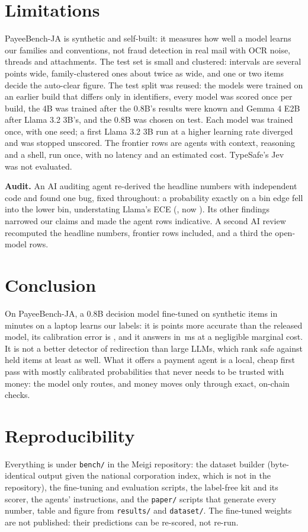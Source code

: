 \documentclass[conference]{IEEEtran}
\begin{document}
\section{Limitations}
PayeeBench-JA is synthetic and self-built: it measures how well a model learns our families and conventions, not fraud
detection in real mail with OCR noise, threads and attachments. The test set is small and clustered: intervals are
several points wide, family-clustered ones about twice as wide, and one or two items decide the \NBudget{} auto-clear
figure. The test split was reused: the models were trained on an earlier build that differs only in identifiers,
every model was scored once per build, the 4B was trained after the 0.8B's results were known and Gemma 4 E2B after
Llama 3.2 3B's, and the 0.8B was chosen on test. Each model was trained once, with one seed; a first Llama 3.2 3B run at a
higher learning rate diverged and was stopped unscored. The frontier rows are agents with context, reasoning and a shell,
run once, with no latency and an estimated cost. TypeSafe's Jev~\cite{typesafe_models} was not evaluated.

\textbf{Audit.} An AI auditing agent re-derived the headline numbers with independent code and found one bug, fixed
throughout: a probability exactly on a bin edge fell into the lower bin, understating Llama's ECE
(\NLlamaEceBeforeFix{}, now \NLlamaEce{}). Its other findings narrowed our claims and made the agent rows indicative. A
second AI review recomputed the headline numbers, frontier rows included, and a third the open-model rows.

\section{Conclusion}
On PayeeBench-JA, a 0.8B decision model fine-tuned on \NNTrain{} synthetic items in \NTrainMin{} minutes on a laptop
learns our labels: it is \NVsBaseDelta{} points more accurate than the released model, its calibration error is
\NOursEceStanding{}, and it answers in \NOursPfifty{}\,ms at a negligible marginal cost. It is not a better detector of
redirection than large LLMs, which rank safe against held items at least as well\NOpenConclusion{}.\NFrontierConclusion{} What it offers
a payment agent is a local, cheap first pass with mostly calibrated probabilities that never needs to be trusted with
money: the model only routes, and money moves only through exact, on-chain checks.

\section*{Reproducibility}
Everything is under \texttt{bench/} in the Meigi repository: the dataset builder (byte-identical output given the
national corporation index, which is not in the repository), the fine-tuning and evaluation scripts, the label-free kit
and its scorer, the agents' instructions, and the \texttt{paper/} scripts that generate every number, table and figure
from \texttt{results/} and \texttt{dataset/}. The fine-tuned weights are not published: their predictions can be
re-scored, not re-run.
\end{document}
